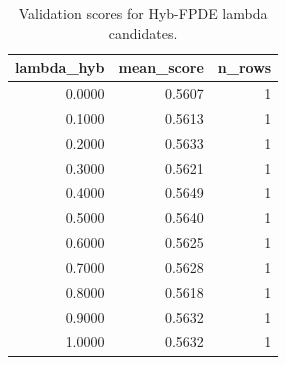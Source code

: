 \begin{table}[t]
\caption{Validation scores for Hyb-FPDE lambda candidates.}
\label{tab:lambda_distribution_computed}
\centering
\begin{tabular}{rrr}
\toprule
lambda\_hyb & mean\_score & n\_rows \\
\midrule
0.0000 & 0.5607 & 1 \\
0.1000 & 0.5613 & 1 \\
0.2000 & 0.5633 & 1 \\
0.3000 & 0.5621 & 1 \\
0.4000 & 0.5649 & 1 \\
0.5000 & 0.5640 & 1 \\
0.6000 & 0.5625 & 1 \\
0.7000 & 0.5628 & 1 \\
0.8000 & 0.5618 & 1 \\
0.9000 & 0.5632 & 1 \\
1.0000 & 0.5632 & 1 \\
\bottomrule
\end{tabular}

\end{table}
